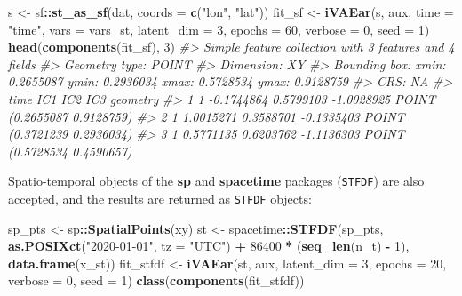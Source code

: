 \documentclass[
]{article}
\newenvironment{Shaded}{\begin{snugshade}}{\end{snugshade}}
\newcommand{\AttributeTok}[1]{\textcolor[rgb]{0.13,0.29,0.53}{#1}}
\newcommand{\CommentTok}[1]{\textcolor[rgb]{0.56,0.35,0.01}{\textit{#1}}}
\newcommand{\DecValTok}[1]{\textcolor[rgb]{0.00,0.00,0.81}{#1}}
\newcommand{\FunctionTok}[1]{\textcolor[rgb]{0.13,0.29,0.53}{\textbf{#1}}}
\newcommand{\NormalTok}[1]{#1}
\newcommand{\OtherTok}[1]{\textcolor[rgb]{0.56,0.35,0.01}{#1}}
\newcommand{\SpecialCharTok}[1]{\textcolor[rgb]{0.81,0.36,0.00}{\textbf{#1}}}
\newcommand{\StringTok}[1]{\textcolor[rgb]{0.31,0.60,0.02}{#1}}
\begin{document}
\begin{Shaded}
\begin{Highlighting}[]
\NormalTok{s }\OtherTok{\textless{}{-}}\NormalTok{ sf}\SpecialCharTok{::}\FunctionTok{st\_as\_sf}\NormalTok{(dat, }\AttributeTok{coords =} \FunctionTok{c}\NormalTok{(}\StringTok{"lon"}\NormalTok{, }\StringTok{"lat"}\NormalTok{))}
\NormalTok{fit\_sf }\OtherTok{\textless{}{-}} \FunctionTok{iVAEar}\NormalTok{(s, aux, }\AttributeTok{time =} \StringTok{"time"}\NormalTok{, }\AttributeTok{vars =}\NormalTok{ vars\_st, }\AttributeTok{latent\_dim =} \DecValTok{3}\NormalTok{,}
                 \AttributeTok{epochs =} \DecValTok{60}\NormalTok{, }\AttributeTok{verbose =} \DecValTok{0}\NormalTok{, }\AttributeTok{seed =} \DecValTok{1}\NormalTok{)}
\FunctionTok{head}\NormalTok{(}\FunctionTok{components}\NormalTok{(fit\_sf), }\DecValTok{3}\NormalTok{)}
\CommentTok{\#\textgreater{} Simple feature collection with 3 features and 4 fields}
\CommentTok{\#\textgreater{} Geometry type: POINT}
\CommentTok{\#\textgreater{} Dimension:     XY}
\CommentTok{\#\textgreater{} Bounding box:  xmin: 0.2655087 ymin: 0.2936034 xmax: 0.5728534 ymax: 0.9128759}
\CommentTok{\#\textgreater{} CRS:           NA}
\CommentTok{\#\textgreater{}   time        IC1       IC2        IC3                    geometry}
\CommentTok{\#\textgreater{} 1    1 {-}0.1744864 0.5799103 {-}1.0028925 POINT (0.2655087 0.9128759)}
\CommentTok{\#\textgreater{} 2    1  1.0015271 0.3588701 {-}0.1335403 POINT (0.3721239 0.2936034)}
\CommentTok{\#\textgreater{} 3    1  0.5771135 0.6203762 {-}1.1136303 POINT (0.5728534 0.4590657)}
\end{Highlighting}
\end{Shaded}

Spatio-temporal objects of the \textbf{sp} and \textbf{spacetime}
packages (\texttt{STFDF}) are also accepted, and the results are
returned as \texttt{STFDF} objects:

\begin{Shaded}
\begin{Highlighting}[]
\NormalTok{sp\_pts }\OtherTok{\textless{}{-}}\NormalTok{ sp}\SpecialCharTok{::}\FunctionTok{SpatialPoints}\NormalTok{(xy)}
\NormalTok{st }\OtherTok{\textless{}{-}}\NormalTok{ spacetime}\SpecialCharTok{::}\FunctionTok{STFDF}\NormalTok{(sp\_pts, }\FunctionTok{as.POSIXct}\NormalTok{(}\StringTok{"2020{-}01{-}01"}\NormalTok{, }\AttributeTok{tz =} \StringTok{"UTC"}\NormalTok{) }\SpecialCharTok{+} \DecValTok{86400} \SpecialCharTok{*}\NormalTok{ (}\FunctionTok{seq\_len}\NormalTok{(n\_t) }\SpecialCharTok{{-}} \DecValTok{1}\NormalTok{),}
                       \FunctionTok{data.frame}\NormalTok{(x\_st))}
\NormalTok{fit\_stfdf }\OtherTok{\textless{}{-}} \FunctionTok{iVAEar}\NormalTok{(st, aux, }\AttributeTok{latent\_dim =} \DecValTok{3}\NormalTok{, }\AttributeTok{epochs =} \DecValTok{20}\NormalTok{, }\AttributeTok{verbose =} \DecValTok{0}\NormalTok{, }\AttributeTok{seed =} \DecValTok{1}\NormalTok{)}
\FunctionTok{class}\NormalTok{(}\FunctionTok{components}\NormalTok{(fit\_stfdf))}
\end{Highlighting}
\end{Shaded}
\end{document}
